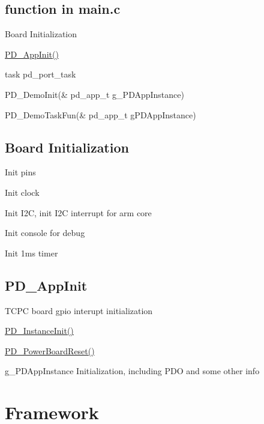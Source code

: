 \subsection*{function in main.\-c}


\begin{DoxyItemize}
\item Board Initialization
\item \hyperlink{main_8c_ae90a39427d391ee932de4fd9adbcde6a}{P\-D\-\_\-\-App\-Init()}
\item task pd\-\_\-port\-\_\-task
\item P\-D\-\_\-\-Demo\-Init(\& pd\-\_\-app\-\_\-t g\-\_\-\-P\-D\-App\-Instance)
\item P\-D\-\_\-\-Demo\-Task\-Fun(\& pd\-\_\-app\-\_\-t g\-P\-D\-App\-Instance)
\end{DoxyItemize}

\subsection*{Board Initialization}


\begin{DoxyItemize}
\item Init pins
\item Init clock
\item Init I2\-C, init I2\-C interrupt for arm core
\item Init console for debug
\item Init 1ms timer
\end{DoxyItemize}

\subsection*{P\-D\-\_\-\-App\-Init}


\begin{DoxyItemize}
\item T\-C\-P\-C board gpio interupt initialization
\item \hyperlink{group__usb__pd__stack_ga3ab001290dc934fd6a45ad93916f5140}{P\-D\-\_\-\-Instance\-Init()}
\item \hyperlink{pd__app_8c_a0fcfdce4020a6f6d89a1dca22db9736d}{P\-D\-\_\-\-Power\-Board\-Reset()}
\item g\-\_\-\-P\-D\-App\-Instance Initialization, including P\-D\-O and some other info
\end{DoxyItemize}

\section*{Framework}

